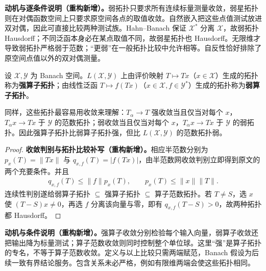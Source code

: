 \documentclass[../../main.tex]{subfiles}
\begin{document}
\begin{remark}
\textbf{动机与逐条件说明（重构新增）。}弱拓扑只要求所有连续标量测量收敛，弱星拓扑则在对偶函数空间上只要求原空间各点的取值收敛。自然嵌入把这些点值测试放进双对偶，因此可直接比较两种测试族。Hahn--Banach 保证 $\mathcal X^*$ 分离 $\mathcal X$，故弱拓扑 Hausdorff；不同泛函本身必在某点取值不同，故弱星拓扑也 Hausdorff。无限维才导致弱拓扑严格弱于范数；“更弱”在一般拓扑比较中允许相等。自反性恰好排除了原空间点值以外的双对偶测量。
\end{remark}
\begin{definition}[强算子拓扑与弱算子拓扑]\label{definition:ch05-operator-topologies}
设 $\mathcal X,\mathcal Y$ 为 Banach 空间。$L(\mathcal X,\mathcal Y)$ 上由评价映射 $T\mapsto Tx$（$x\in\mathcal X$）生成的拓扑称为\textbf{强算子拓扑}；由线性泛函 $T\mapsto f(Tx)$（$x\in\mathcal X,f\in\mathcal Y^*$）生成的拓扑称为\textbf{弱算子拓扑}。
\end{definition}
同样，这些拓扑最容易用收敛来理解：$T_\alpha\to T$ 强收敛当且仅当对每个 $x$，$T_\alpha x\to Tx$ 于 $\mathcal Y$ 的范数拓扑；弱收敛当且仅当对每个 $x$，$T_\alpha x\to Tx$ 于 $\mathcal Y$ 的弱拓扑。因此强算子拓扑比弱算子拓扑强，但比 $L(\mathcal X,\mathcal Y)$ 的范数拓扑弱。
\begin{proof}
\textbf{收敛判别与拓扑比较补写（重构新增）。}相应半范数分别为 $p_x(T)=\|Tx\|$ 与 $q_{x,f}(T)=|f(Tx)|$，由半范数网收敛判别立即得到原文的两个充要条件。并且
\begin{align*}
q_{x,f}(T)\le\|f\|p_x(T),\qquad p_x(T)\le\|x\|\|T\|.
\end{align*}
连续性判别遂给弱算子拓扑 $\subseteq$ 强算子拓扑 $\subseteq$ 算子范数拓扑。若 $T\ne S$，选 $x$ 使 $(T-S)x\ne0$，再选 $f$ 分离该向量与零，即有 $q_{x,f}(T-S)>0$，故两种拓扑都 Hausdorff。
\end{proof}
\begin{remark}
\textbf{动机与条件说明（重构新增）。}强算子收敛分别检验每个输入向量，弱算子收敛还把输出降为标量测试；算子范数收敛则同时控制整个单位球。这里“强”是算子拓扑的专名，不等于算子范数收敛。定义与以上比较只需两端赋范，Banach 假设为后续一致有界结论服务。包含关系未必严格，例如有限维两端会使这些拓扑相同。
\end{remark}
\end{document}
